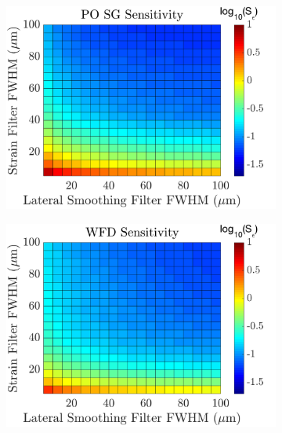 \begin{figure}[h!]
\begin{subfigure}{0.49\textwidth}
	        \includegraphics[width=\textwidth]{appendix_figs/posg_sensitivity.png}
	\end{subfigure}
    	\begin{subfigure}{0.49\textwidth}
    		\centering
	        \includegraphics[width=\textwidth]{appendix_figs/wfd_sensitivity.png}
	\end{subfigure}
    	\\
    	\begin{subfigure}{0.49\textwidth}
    		\centering

\end{subfigure}
\end{figure}
